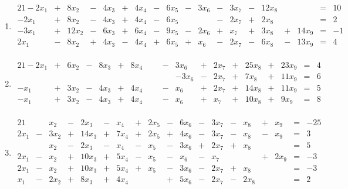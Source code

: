 \documentclass[12pt]{article}
\begin{document}
\begin{enumerate}
\item \begin{alignat*}{21}
- 2 x_{1} &{}+{}& 8 x_{2} &{}-{}& 4 x_{3} &{}+{}& 4 x_{4} &{}-{}& 6 x_{5} &{}-{}& 3 x_{6} &{}-{}& 3 x_{7} &{}-{}& 12 x_{8}&{}{}& &{}={}&10\\ 
- 2 x_{1} &{}+{}& 8 x_{2} &{}-{}& 4 x_{3} &{}+{}& 4 x_{4} &{}-{}& 6 x_{5}&{}{}& &{}-{}& 2 x_{7} &{}+{}& 2 x_{8}&{}{}& &{}={}&2\\ 
- 3 x_{1} &{}+{}& 12 x_{2} &{}-{}& 6 x_{3} &{}+{}& 6 x_{4} &{}-{}& 9 x_{5} &{}-{}& 2 x_{6} &{}+{}& x_{7} &{}+{}& 3 x_{8} &{}+{}& 14 x_{9} &{}={}&-1\\ 
2 x_{1} &{}-{}& 8 x_{2} &{}+{}& 4 x_{3} &{}-{}& 4 x_{4} &{}+{}& 6 x_{5} &{}+{}& x_{6} &{}-{}& 2 x_{7} &{}-{}& 6 x_{8} &{}-{}& 13 x_{9} &{}={}&4\\ 
\end{alignat*}

\item \begin{alignat*}{21}
- 2 x_{1} &{}+{}& 6 x_{2} &{}-{}& 8 x_{3} &{}+{}& 8 x_{4}&{}{}& &{}-{}& 3 x_{6} &{}+{}& 2 x_{7} &{}+{}& 25 x_{8} &{}+{}& 23 x_{9} &{}={}&4\\ 
&{}{}&&{}{}&&{}{}&&{}{}&&{}{}&- 3 x_{6} &{}-{}& 2 x_{7} &{}+{}& 7 x_{8} &{}+{}& 11 x_{9} &{}={}&6\\ 
- x_{1} &{}+{}& 3 x_{2} &{}-{}& 4 x_{3} &{}+{}& 4 x_{4}&{}{}& &{}-{}& x_{6} &{}+{}& 2 x_{7} &{}+{}& 14 x_{8} &{}+{}& 11 x_{9} &{}={}&5\\ 
- x_{1} &{}+{}& 3 x_{2} &{}-{}& 4 x_{3} &{}+{}& 4 x_{4}&{}{}& &{}-{}& x_{6} &{}+{}& x_{7} &{}+{}& 10 x_{8} &{}+{}& 9 x_{9} &{}={}&8\\ 
\end{alignat*}

\item \begin{alignat*}{21}
&{}{}&x_{2} &{}-{}& 2 x_{3} &{}-{}& x_{4} &{}+{}& 2 x_{5} &{}-{}& 6 x_{6} &{}-{}& 3 x_{7} &{}-{}& x_{8} &{}+{}& x_{9} &{}={}&-25\\ 
2 x_{1} &{}-{}& 3 x_{2} &{}+{}& 14 x_{3} &{}+{}& 7 x_{4} &{}+{}& 2 x_{5} &{}+{}& 4 x_{6} &{}-{}& 3 x_{7} &{}-{}& x_{8} &{}-{}& x_{9} &{}={}&3\\ 
&{}{}&x_{2} &{}-{}& 2 x_{3} &{}-{}& x_{4} &{}-{}& x_{5} &{}-{}& 3 x_{6} &{}+{}& 2 x_{7} &{}+{}& x_{8}&{}{}& &{}={}&5\\ 
2 x_{1} &{}-{}& x_{2} &{}+{}& 10 x_{3} &{}+{}& 5 x_{4} &{}-{}& x_{5} &{}-{}& x_{6} &{}-{}& x_{7}&{}{}& &{}+{}& 2 x_{9} &{}={}&-3\\ 
2 x_{1} &{}-{}& x_{2} &{}+{}& 10 x_{3} &{}+{}& 5 x_{4} &{}+{}& x_{5} &{}-{}& 3 x_{6} &{}-{}& 2 x_{7} &{}+{}& x_{8}&{}{}& &{}={}&-3\\ 
x_{1} &{}-{}& 2 x_{2} &{}+{}& 8 x_{3} &{}+{}& 4 x_{4}&{}{}& &{}+{}& 5 x_{6} &{}-{}& 2 x_{7} &{}-{}& 2 x_{8}&{}{}& &{}={}&2\\ 
\end{alignat*}


\end{enumerate}
\end{document}
